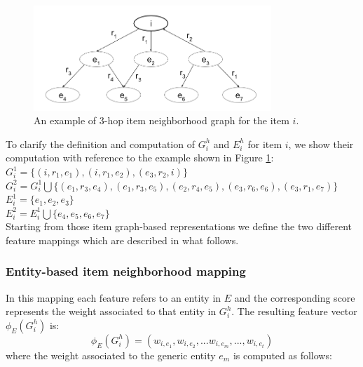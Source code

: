 \begin{figure}
\begin{center}
\includegraphics[width=0.8\textwidth]{ch07_graph-rec_pics/item_neig2.png}
\end{center}
\caption{An example of 3-hop item neighborhood graph for the item $i$.}
\label{fig:graph-rec:Example}
\end{figure}

To clarify the definition and computation of $G^h_i$ and $E^h_i$ for item $i$, we show their computation with reference to the example shown in Figure \ref{fig:graph-rec:Example}:\\ 
$G^1_i= \lbrace (i,r_1,e_1), (i,r_1,e_2), (e_3,r_2,i)\rbrace$\\ 
$G^2_i= G^1_i \bigcup \lbrace (e_1,r_3,e_4), (e_1,r_3,e_5), (e_2,r_4,e_5), (e_3,r_6,e_6),(e_3,r_1,e_7) \rbrace$\\
$E^1_i= \lbrace e_1, e_2, e_3 \rbrace$\\
$E^2_i=  E^1_i \bigcup  \lbrace e_4, e_5, e_6, e_7 \rbrace$\\

Starting from those item graph-based representations we define the two different feature mappings which are described in what follows.

\subsubsection{Entity-based item neighborhood mapping}

In this mapping each feature refers to an entity in $E$ and the corresponding score represents the weight associated to that entity in $G^h_i$. The resulting feature vector $\phi_E(G^h_i)$ is:
\[
\phi_E(G^h_i)=(w_{i,e_1} ,w_{i,e_2} ,...w_{i,e_m} ,...,w_{i,e_t} )
\]
where the weight associated to the generic entity $e_m$ is computed as follows:

